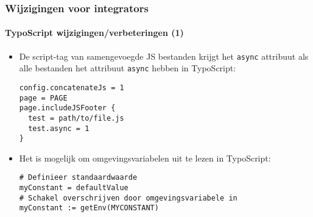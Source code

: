 
\begin{frame}[fragile]
	\frametitle{Wijzigingen voor integrators}
	\framesubtitle{TypoScript wijzigingen/verbeteringen (1)}

	\lstset{basicstyle=\smaller\ttfamily}

	\begin{itemize}
		\item De script-tag van samengevoegde JS bestanden krijgt het \texttt{async} attribuut
		 als alle bestanden het attribuut \texttt{async} hebben in TypoScript:

			\begin{lstlisting}
config.concatenateJs = 1
page = PAGE
page.includeJSFooter {
  test = path/to/file.js
  test.async = 1
}
			\end{lstlisting}

		\item Het is mogelijk om omgevingsvariabelen uit te lezen in TypoScript:

			\begin{lstlisting}
# Definieer standaardwaarde
myConstant = defaultValue
# Schakel overschrijven door omgevingsvariabele in
myConstant := getEnv(MYCONSTANT)
			\end{lstlisting}

	\end{itemize}

\end{frame}


